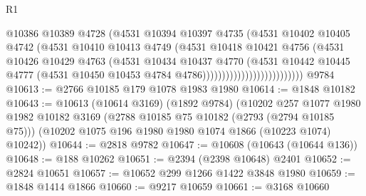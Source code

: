 \begin{lexlean}{R1}
\begin{coremodule}
                                        @10386
                                        @10389
                                        @4728
                                        (@4531
                                          @10394
                                          @10397
                                          @4735
                                          (@4531
                                            @10402
                                            @10405
                                            @4742
                                            (@4531
                                              @10410
                                              @10413
                                              @4749
                                              (@4531
                                                @10418
                                                @10421
                                                @4756
                                                (@4531
                                                  @10426
                                                  @10429
                                                  @4763
                                                  (@4531
                                                    @10434
                                                    @10437
                                                    @4770
                                                    (@4531
                                                      @10442
                                                      @10445
                                                      @4777
                                                      (@4531
                                                        @10450
                                                        @10453
                                                        @4784
                                                        @4786))))))))))))))))))))))))))
    @9784
@10613 := @2766 @10185 @179 @1078 @1983 @1980
@10614 := @1848 @10182
@10643 := @10613
    (@10614 @3169)
    (@1892 @9784)
    (@10202
      @257
      @1077
      @1980
      @1982
      @10182
      @3169
      (@2788 @10185 @75 @10182 (@2793 (@2794 @10185 @75)))
      (@10202 @1075 @196 @1980 @1980 @1074 @1866 (@10223 @1074) @10242))
@10644 := @2818 @9782
@10647 := @10608 (@10643 (@10644 @136))
@10648 := @188 @10262
@10651 := @2394 (@2398 @10648) @2401
@10652 := @2824 @10651
@10657 := @10652 @299 @1266 @1422 @3848 @1980
@10659 := @1848 @1414 @1866
@10660 := @9217 @10659
@10661 := @3168 @10660

\end{coremodule}
\end{lexlean}
